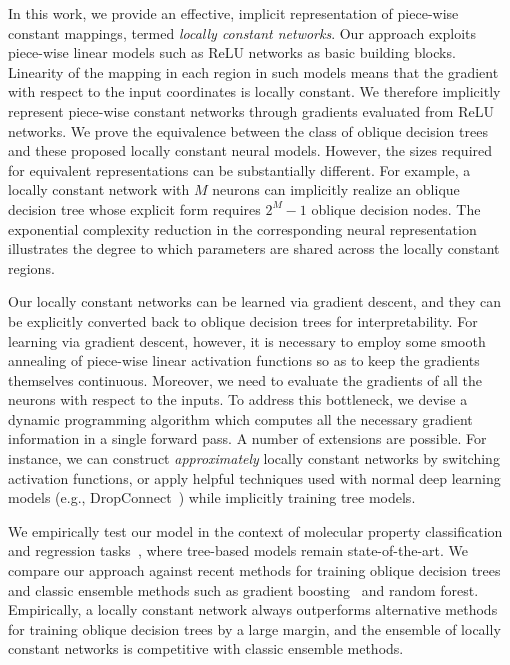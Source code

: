 \documentclass{article} \usepackage{iclr2020_conference,times}
\begin{document}
In this work, we provide an effective, implicit representation of piece-wise constant mappings, termed \emph{locally constant networks}. Our approach exploits piece-wise linear models such as ReLU networks as basic building blocks. Linearity of the mapping in each region in such models means that the gradient with respect to the input coordinates is locally constant. We therefore implicitly represent piece-wise constant networks through gradients evaluated from ReLU networks. We prove the equivalence between the class of oblique decision trees and these proposed locally constant neural models. However, the sizes required for equivalent representations can be substantially different. For example, a locally constant network with $M$ neurons can implicitly realize an oblique decision tree whose explicit form requires $2^M-1$ oblique decision nodes. The exponential complexity reduction in the corresponding neural representation illustrates the degree to which parameters are shared across the locally constant regions.
 
Our locally constant networks can be learned via gradient descent, and they can be explicitly converted back to oblique decision trees for interpretability. For learning via gradient descent, however, it is necessary to employ some smooth annealing of piece-wise linear activation functions so as to keep the gradients themselves continuous. Moreover, we need to evaluate the gradients of all the neurons with respect to the inputs. To address this bottleneck, we devise a dynamic programming algorithm which computes all the necessary gradient information in a single forward pass. A number of extensions are possible. For instance, we can construct \emph{approximately} locally constant networks by switching activation functions, or apply helpful techniques used with normal deep learning models (e.g., DropConnect~\citep{wan2013regularization}) while implicitly training tree models. 


We empirically test our model in the context of molecular property classification and regression tasks~\citep{wu2018moleculenet}, where tree-based models remain state-of-the-art. We compare our approach against recent methods for training oblique decision trees and classic ensemble methods such as gradient boosting~\citep{friedman2001greedy} and random forest. Empirically, a locally constant network always outperforms alternative methods for training oblique decision trees by a large margin, and the ensemble of locally constant networks is competitive with classic ensemble methods. 
\end{document}
